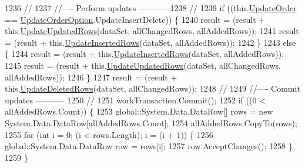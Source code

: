 \begin{DoxyCode}
1236                 \textcolor{comment}{// }
1237                 \textcolor{comment}{//---- Perform updates -----------}
1238                 \textcolor{comment}{//}
1239                 \textcolor{keywordflow}{if} ((this.\hyperlink{class_proyecto___integrador__3_1_1ds_servicios_table_adapters_1_1_table_adapter_manager_a091630e6863de7670f950252387391a2}{UpdateOrder} == \hyperlink{class_proyecto___integrador__3_1_1ds_servicios_table_adapters_1_1_table_adapter_manager_a9e1f8ef540de00f735f491b729080797}{UpdateOrderOption}.UpdateInsertDelete))
       \{
1240                     result = (result + this.\hyperlink{class_proyecto___integrador__3_1_1ds_servicios_table_adapters_1_1_table_adapter_manager_a800bbbaf23f900584fa0b95d8c3b171b}{UpdateUpdatedRows}(dataSet, allChangedRows, 
      allAddedRows));
1241                     result = (result + this.\hyperlink{class_proyecto___integrador__3_1_1ds_servicios_table_adapters_1_1_table_adapter_manager_afd9bc5851d98a4a12ce07dce45912685}{UpdateInsertedRows}(dataSet, allAddedRows));
1242                 \}
1243                 \textcolor{keywordflow}{else} \{
1244                     result = (result + this.\hyperlink{class_proyecto___integrador__3_1_1ds_servicios_table_adapters_1_1_table_adapter_manager_afd9bc5851d98a4a12ce07dce45912685}{UpdateInsertedRows}(dataSet, allAddedRows));
1245                     result = (result + this.\hyperlink{class_proyecto___integrador__3_1_1ds_servicios_table_adapters_1_1_table_adapter_manager_a800bbbaf23f900584fa0b95d8c3b171b}{UpdateUpdatedRows}(dataSet, allChangedRows, 
      allAddedRows));
1246                 \}
1247                 result = (result + this.\hyperlink{class_proyecto___integrador__3_1_1ds_servicios_table_adapters_1_1_table_adapter_manager_a804886cac0d2de3f6c24b4b36f70a2bf}{UpdateDeletedRows}(dataSet, allChangedRows));
1248                 \textcolor{comment}{// }
1249                 \textcolor{comment}{//---- Commit updates -----------}
1250                 \textcolor{comment}{//}
1251                 workTransaction.Commit();
1252                 \textcolor{keywordflow}{if} ((0 < allAddedRows.Count)) \{
1253                     global::System.Data.DataRow[] rows = \textcolor{keyword}{new} System.Data.DataRow[allAddedRows.Count];
1254                     allAddedRows.CopyTo(rows);
1255                     \textcolor{keywordflow}{for} (\textcolor{keywordtype}{int} i = 0; (i < rows.Length); i = (i + 1)) \{
1256                         global::System.Data.DataRow row = rows[i];
1257                         row.AcceptChanges();
1258                     \}
1259                 \}

\end{DoxyCode}
